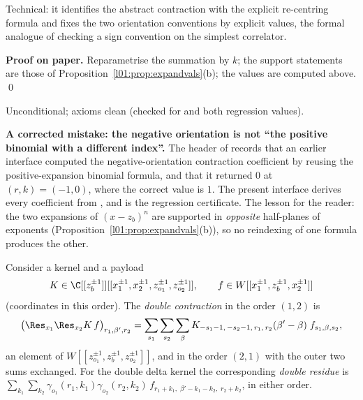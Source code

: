 \begin{physics}
Technical: it identifies the abstract contraction with the explicit re-centring formula and fixes the two
orientation conventions by explicit values, the formal analogue of checking a sign convention on the simplest
correlator.
\end{physics}

\textbf{Proof on paper.} Reparametrise the summation by $k$; the support statements are those of
Proposition~\ref{l01:prop:expandvals}(b); the values are computed above. \qed

\begin{status}
Unconditional; axioms clean (checked for  and both regression values).
\end{status}

\begin{warning}\label{l01:warn:binomialinterface}
\textbf{A corrected mistake: the negative orientation is not ``the positive binomial with a different index''.} The header
of  records that an earlier interface computed the negative-orientation contraction
coefficient by reusing the positive-expansion binomial formula, and that it returned $0$ at $(r,k) = (-1,0)$, where the
correct value is $1$. The present interface derives every coefficient from , and
 is the regression certificate. The lesson for the reader: the two expansions of
$(x-z_b)^n$ are supported in \emph{opposite} half-planes of exponents (Proposition~\ref{l01:prop:expandvals}(b)), so no
reindexing of one formula produces the other.
\end{warning}

\begin{definition}\label{l01:def:kernelcontract}
Consider a kernel and a payload
\begin{equation*}
  K\in\C[[z_b^{\pm1}]][[x_1^{\pm1},x_2^{\pm1},z_{o_1}^{\pm1},z_{o_2}^{\pm1}]],\qquad
  f\in W[[x_1^{\pm1},z_b^{\pm1},x_2^{\pm1}]]
\end{equation*}
(coordinates in this order). The \emph{double contraction} in the order $(1,2)$ is
\begin{equation*}
  \big(\Res_{x_1}\Res_{x_2}K\,f\big)_{r_1,\beta',r_2} = \sum_{s_1}\sum_{s_2}\sum_{\beta}
  K_{-s_1-1,\,-s_2-1,\,r_1,\,r_2}(\beta'-\beta)\;f_{s_1,\beta,s_2},
\end{equation*}
an element of $W[[z_{o_1}^{\pm1},z_b^{\pm1},z_{o_2}^{\pm1}]]$, and in the order $(2,1)$ with the outer two sums exchanged. For the
double delta kernel the corresponding \emph{double residue} is
$\sum_{k_1}\sum_{k_2}\gamma_{o_1}(r_1,k_1)\gamma_{o_2}(r_2,k_2)\,f_{r_1+k_1,\;\beta'-k_1-k_2,\;r_2+k_2}$, in either order.
\end{definition}


